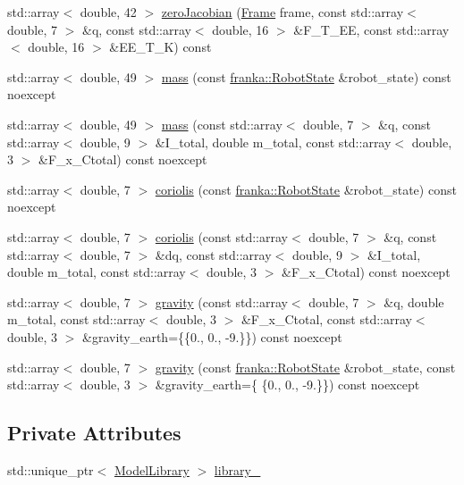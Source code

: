 \begin{DoxyCompactItemize}
\item 
std\+::array$<$ double, 42 $>$ \hyperlink{classfranka_1_1Model_a4b5cfa12760f3db4b919ac0651614386}{zero\+Jacobian} (\hyperlink{namespacefranka_a00b729ddce916481d3f0d10febec4f5b}{Frame} frame, const std\+::array$<$ double, 7 $>$ \&q, const std\+::array$<$ double, 16 $>$ \&F\+\_\+\+T\+\_\+\+EE, const std\+::array$<$ double, 16 $>$ \&E\+E\+\_\+\+T\+\_\+K) const
\item 
std\+::array$<$ double, 49 $>$ \hyperlink{classfranka_1_1Model_a39eefe959a2a9155b4782b98ad766530}{mass} (const \hyperlink{structfranka_1_1RobotState}{franka\+::\+Robot\+State} \&robot\+\_\+state) const noexcept
\item 
std\+::array$<$ double, 49 $>$ \hyperlink{classfranka_1_1Model_a8ad5a8fcf29a3112c10664b644d2151a}{mass} (const std\+::array$<$ double, 7 $>$ \&q, const std\+::array$<$ double, 9 $>$ \&I\+\_\+total, double m\+\_\+total, const std\+::array$<$ double, 3 $>$ \&F\+\_\+x\+\_\+\+Ctotal) const noexcept
\item 
std\+::array$<$ double, 7 $>$ \hyperlink{classfranka_1_1Model_a9be45a91c3288088dd222f2e55870aa8}{coriolis} (const \hyperlink{structfranka_1_1RobotState}{franka\+::\+Robot\+State} \&robot\+\_\+state) const noexcept
\item 
std\+::array$<$ double, 7 $>$ \hyperlink{classfranka_1_1Model_a4f9edd79fba1989a09cda4aeaf811bf2}{coriolis} (const std\+::array$<$ double, 7 $>$ \&q, const std\+::array$<$ double, 7 $>$ \&dq, const std\+::array$<$ double, 9 $>$ \&I\+\_\+total, double m\+\_\+total, const std\+::array$<$ double, 3 $>$ \&F\+\_\+x\+\_\+\+Ctotal) const noexcept
\item 
std\+::array$<$ double, 7 $>$ \hyperlink{classfranka_1_1Model_a9ebf2dbe37a78071fd74d2e552125cb4}{gravity} (const std\+::array$<$ double, 7 $>$ \&q, double m\+\_\+total, const std\+::array$<$ double, 3 $>$ \&F\+\_\+x\+\_\+\+Ctotal, const std\+::array$<$ double, 3 $>$ \&gravity\+\_\+earth=\{\{0., 0., -\/9.\}\}) const noexcept
\item 
std\+::array$<$ double, 7 $>$ \hyperlink{classfranka_1_1Model_abe3bf8777c9476d2d089dc6b9a4f638c}{gravity} (const \hyperlink{structfranka_1_1RobotState}{franka\+::\+Robot\+State} \&robot\+\_\+state, const std\+::array$<$ double, 3 $>$ \&gravity\+\_\+earth=\{ \{0., 0., -\/9.\}\}) const noexcept
\end{DoxyCompactItemize}
\subsection*{Private Attributes}
\begin{DoxyCompactItemize}
\item 
std\+::unique\+\_\+ptr$<$ \hyperlink{classfranka_1_1ModelLibrary}{Model\+Library} $>$ \hyperlink{classfranka_1_1Model_a966abbe74240654b093b4d18476ab09b}{library\+\_\+}
\end{DoxyCompactItemize}


